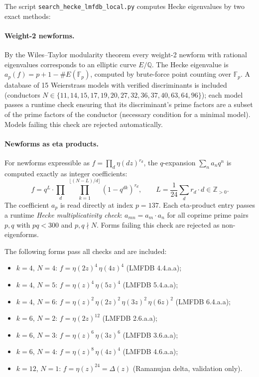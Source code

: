\documentclass[12pt,a4paper]{article}
\begin{document}
The script \texttt{search\_hecke\_lmfdb\_local.py} computes Hecke eigenvalues
by two exact methods:

\paragraph{Weight-2 newforms.}  By the Wiles--Taylor modularity theorem every
weight-2 newform with rational eigenvalues corresponds to an elliptic curve
$E/\mathbb{Q}$.  The Hecke eigenvalue is $a_p(f) = p + 1 - \#E(\mathbb{F}_p)$,
computed by brute-force point counting over $\mathbb{F}_p$.
A database of 15 Weierstrass models with verified discriminants is included
(conductors $N \in \{11,14,15,17,19,20,27,32,36,37,40,63,64,96\}$);
each model passes a runtime check ensuring that its discriminant's prime
factors are a subset of the prime factors of the conductor (necessary condition
for a minimal model).  Models failing this check are rejected automatically.

\paragraph{Newforms as eta products.}
For newforms expressible as $f = \prod_d \eta(dz)^{r_d}$, the $q$-expansion
$\sum_n a_n q^n$ is computed exactly as integer coefficients:
\begin{equation}
  f = q^L \cdot \prod_{d}\;\prod_{k=1}^{\lfloor (N-L)/d \rfloor} (1-q^{dk})^{r_d},
  \qquad L = \frac{1}{24}\sum_d r_d \cdot d \in \mathbb{Z}_{>0}.
\end{equation}
The coefficient $a_p$ is read directly at index $p = 137$.
Each eta-product entry passes a runtime \emph{Hecke multiplicativity check}:
$a_{mn} = a_m \cdot a_n$ for all coprime prime pairs $p, q$ with $pq < 300$
and $p, q \nmid N$.  Forms failing this check are rejected as non-eigenforms.

The following forms pass all checks and are included:
\begin{itemize}
  \item $k=4$, $N=4$: $f = \eta(2z)^4\,\eta(4z)^4$ (LMFDB 4.4.a.a);
  \item $k=4$, $N=5$: $f = \eta(z)^4\,\eta(5z)^4$ (LMFDB 5.4.a.a);
  \item $k=4$, $N=6$: $f = \eta(z)^2\,\eta(2z)^2\,\eta(3z)^2\,\eta(6z)^2$
        (LMFDB 6.4.a.a);
  \item $k=6$, $N=2$: $f = \eta(2z)^{12}$ (LMFDB 2.6.a.a);
  \item $k=6$, $N=3$: $f = \eta(z)^6\,\eta(3z)^6$ (LMFDB 3.6.a.a);
  \item $k=6$, $N=4$: $f = \eta(z)^8\,\eta(4z)^4$ (LMFDB 4.6.a.a);
  \item $k=12$, $N=1$: $f = \eta(z)^{24} = \Delta(z)$ (Ramanujan delta, validation only).
\end{itemize}
\end{document}
